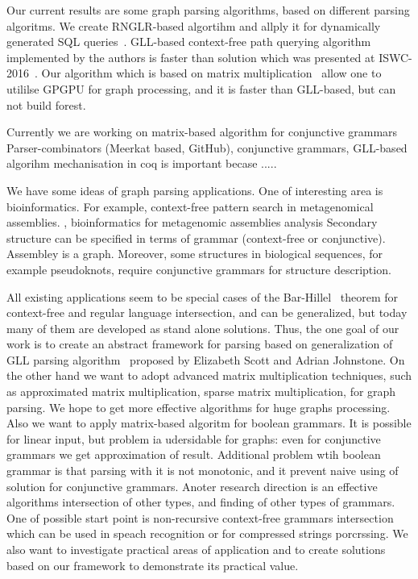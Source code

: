 \documentclass{vldb}
\begin{document}
Our current results are some graph parsing algorithms, based on different parsing algoritms.
We create RNGLR-based algortihm and allply it for dynamically generated SQL queries~\cite{RelaxedRNGLR}.
GLL-based context-free path querying algorithm~\cite{GraphGLL} implemented by the authors is faster than solution which was presented at ISWC-2016~\cite{CFRDFParsing}. 
Our algorithm which is based on matrix multiplication~\cite{GraphParsingMatrix} allow one to utililse GPGPU for graph processing, and it is faster than GLL-based, but can not build forest.

Currently we are working on matrix-based algorithm for conjunctive grammars
Parser-combinators (Meerkat based, GitHub), conjunctive grammars,
GLL-based algorihm mechanisation in coq is important becase .....

We have some ideas of graph parsing applications.
One of interesting area is bioinformatics.
For example, context-free pattern search in metagenomical assemblies.  , bioinformatics for metagenomic assemblies analysis
Secondary structure can be specified in terms of grammar (context-free or conjunctive).
Assembley is a graph.
Moreover, some structures in biological sequences, for example pseudoknots, require conjunctive grammars for structure description.

All existing applications seem to be special cases of the Bar-Hillel~\cite{Bar-Hillel} theorem for context-free and regular language intersection, and can be generalized, but today many of them are developed as stand alone solutions.
Thus, the one goal of our work is to create an abstract framework for parsing based on generalization of GLL parsing algorithm~\cite{GLL} proposed by Elizabeth Scott and Adrian Johnstone. 
On the other hand we want to adopt advanced matrix multiplication techniques, such as approximated matrix multiplication, sparse matrix multiplication, for graph parsing.
We hope to get more effective algorithms for huge graphs processing.
Also we want to apply matrix-based algoritm for boolean grammars. 
It is possible for linear input, but problem ia udersidable for graphs: even for conjunctive grammars we get approximation of result. 
Additional problem wtih boolean grammar is that parsing with it is not monotonic, and it prevent 
naive using of solution for conjunctive grammars.
Anoter research direction is an effective algorithms intersection of other types, and finding of other types of grammars.
One of possible start point is non-recursive context-free grammars intersection~\cite{Nederhof1, Nederhof2} which can be used in speach recognition or for compressed strings porcrssing. 
We also want to investigate practical areas of application and to create solutions based on our framework to demonstrate its practical value.
\end{document}
